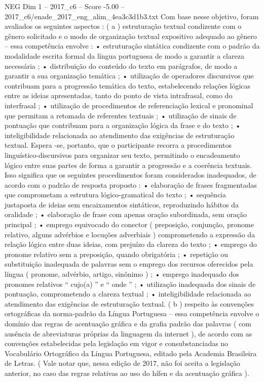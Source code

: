 \begin{textsample}{NEG Dim 1 – 2017\_c6 – Score -5.00 – 2017\_c6/enade\_2017\_eng\_alim\_4ea3c3d1b3.txt}
Com base nesse objetivo, foram avaliados os seguintes aspectos : ( a ) estruturação textual condizente com o gênero solicitado e o modo de organização textual expositivo adequado ao gênero – essa competência envolve : • estruturação sintática condizente com o padrão da modalidade escrita formal da língua portuguesa de modo a garantir a clareza necessária ; • distribuição do conteúdo do texto em parágrafos, de modo a garantir a sua organização temática ; • utilização de operadores discursivos que contribuam para a progressão temática do texto, estabelecendo relações lógicas entre as ideias apresentadas, tanto do ponto de vista intrafrasal, como do interfrasal ; • utilização de procedimentos de referenciação lexical e pronominal que permitam a retomada de referentes textuais ; • utilização de sinais de pontuação que contribuam para a organização lógica da frase e do texto ; • inteligibilidade relacionada ao atendimento das exigências de estruturação textual.
Espera -se, portanto, que o participante recorra a procedimentos linguístico-discursivos para organizar seu texto, permitindo o encadeamento lógico entre suas partes de forma a garantir a progressão e a coerência textuais.
Isso significa que os seguintes procedimentos foram considerados inadequados, de acordo com o padrão de resposta proposto : • elaboração de frases fragmentadas que comprometam a estrutura lógico-gramatical do texto ; • sequência justaposta de ideias sem encaixamentos sintáticos, reproduzindo hábitos da oralidade ; • elaboração de frase com apenas oração subordinada, sem oração principal ; • emprego equivocado do conector ( preposição, conjunção, pronome relativo, alguns advérbios e locuções adverbiais ) comprometendo a expressão da relação lógica entre duas ideias, com prejuízo da clareza do texto ; • emprego do pronome relativo sem a preposição, quando obrigatória ; • repetição ou substituição inadequada de palavras sem o emprego dos recursos oferecidos pela língua ( pronome, advérbio, artigo, sinônimo ) ; • emprego inadequado dos pronomes relativos “ cujo(a) ” e “ onde ” ; • utilização inadequada dos sinais de pontuação, comprometendo a clareza textual ; • inteligibilidade relacionada ao atendimento das exigências de estruturação textual. ( b ) respeito às convenções ortográficas da norma-padrão da Língua Portuguesa – essa competência envolve o domínio das regras de acentuação gráfica e da grafia padrão das palavras ( com ausência de abreviaturas próprias da linguagem da internet ), de acordo com as convenções estabelecidas pela legislação em vigor e consubstanciadas no Vocabulário Ortográfico da Língua Portuguesa, editado pela Academia Brasileira de Letras. ( Vale notar que, nessa edição de 2017, não foi aceita a legislação anterior, no caso das regras relativas ao uso do hífen e da acentuação gráfica ).

\end{textsample}
